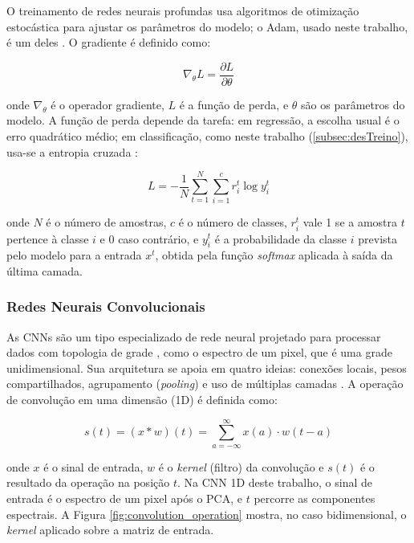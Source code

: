 O treinamento de redes neurais profundas usa algoritmos de otimização estocástica para ajustar os parâmetros do modelo; o Adam, usado neste trabalho, é um deles \cite{kingma2017adammethodstochasticoptimization}. O gradiente é definido como:

\begin{equation}
\nabla_{\theta} L = \frac{\partial L}{\partial \theta}
\end{equation}

\noindent onde $\nabla_{\theta}$ é o operador gradiente, $L$ é a função de perda, e $\theta$ são os parâmetros do modelo. A função de perda depende da tarefa: em regressão, a escolha usual é o erro quadrático médio; em classificação, como neste trabalho (\autoref{subsec:desTreino}), usa-se a entropia cruzada \cite{DeepLearningIG}:

\begin{equation}
L = -\frac{1}{N} \sum_{t=1}^{N} \sum_{i=1}^{c} r_i^t \log y_i^t
\end{equation}

\noindent onde $N$ é o número de amostras, $c$ é o número de classes, $r_i^t$ vale 1 se a amostra $t$ pertence à classe $i$ e 0 caso contrário, e $y_i^t$ é a probabilidade da classe $i$ prevista pelo modelo para a entrada $x^t$, obtida pela função \textit{softmax} aplicada à saída da última camada.

\subsubsection{Redes Neurais Convolucionais}

As CNNs são um tipo especializado de rede neural projetado para processar dados com topologia de grade \cite{DeepLearningIG}, como o espectro de um pixel, que é uma grade unidimensional. Sua arquitetura se apoia em quatro ideias: conexões locais, pesos compartilhados, agrupamento (\textit{pooling}) e uso de múltiplas camadas \cite{DeeplearningLC}. A operação de convolução em uma dimensão (1D) é definida como:

\begin{equation}
s(t) = (x \ast w)(t) = \sum_{a=-\infty}^{\infty} x(a) \cdot w(t-a)
\end{equation}

\noindent onde $x$ é o sinal de entrada, $w$ é o \textit{kernel} (filtro) da convolução e $s(t)$ é o resultado da operação na posição $t$. Na CNN 1D deste trabalho, o sinal de entrada é o espectro de um pixel após o PCA, e $t$ percorre as componentes espectrais. A Figura \ref{fig:convolution_operation} mostra, no caso bidimensional, o \textit{kernel} aplicado sobre a matriz de entrada.

